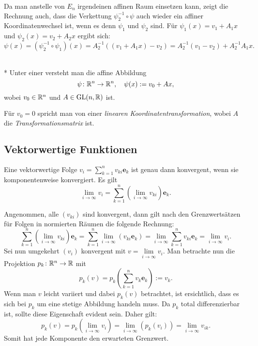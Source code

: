 Da man anstelle von $E_n$ irgendeinen affinen Raum einsetzen kann,
zeigt die Rechnung auch, dass die Verkettung $\psi_2^{-1}\circ\psi$
auch wieder ein affiner Koordinatenwechsel ist, wenn es denn $\psi_1$
und $\psi_2$ sind. Für $\psi_1(x)=v_1+A_1 x$ und
$\psi_2(x) = v_2+A_2 x$
ergibt sich:%
\begin{equation}
\psi(x) = (\psi_2^{-1}\circ\psi_1)(x)
= A_2^{-1}((v_1+A_1x)-v_2)
= A_2^{-1}(v_1-v_2) + A_2^{-1} A_1 x.
\end{equation}

\begin{definition}\mbox{}\\*
Unter einer  versteht man
die affine Abbildung
\begin{equation}
\psi\colon\mathbb R^n\to\mathbb R^n,\quad \psi(x):=v_0+Ax,
\end{equation}
wobei $v_0\in\mathbb R^n$ und $A\in\operatorname{GL}(n,\mathbb R)$ ist.
\end{definition}
Für $v_0=0$ spricht man von einer \emph{linearen
Koordinatentransformation}, wobei $A$ die \emph{Transformationsmatrix}
ist.

\subsection{Vektorwertige Funktionen}
\begin{theorem}\label{lim-vektorwertige-Folge}
Eine vektorwertige Folge $v_i = \sum_{k=1}^n v_{ki}\mathbf e_k$
ist genau dann konvergent, wenn sie komponentenweise konvergiert.
Es gilt
\begin{equation}
\lim_{i\to\infty} v_i
= \sum_{k=1}^n (\lim_{i\to\infty} v_{ki})\mathbf e_k.
\end{equation}
\end{theorem}
 Angenommen, alle $(v_{ki})$ sind konvergent, dann gilt
nach den Grenzwertsätzen für Folgen in normierten Räumen die folgende
Rechnung:
\begin{equation}
\sum_{k=1}^n (\lim_{i\to\infty} v_{ki})\mathbf e_k
= \sum_{k=1}^n \lim_{i\to\infty} (v_{ki}\mathbf e_k)
= \lim_{i\to\infty}\sum_{k=1}^n v_{ki}\mathbf e_k = \lim_{i\to\infty} v_i.
\end{equation}
Sei nun umgekehrt $(v_i)$ konvergent mit $v = \lim\limits_{i\to\infty} v_i$.
Man betrachte nun die Projektion $p_k\colon\mathbb R^n\to\mathbb R$ mit
\begin{equation}
p_k(v) = p_k(\sum_{k=1}^n v_k\mathbf e_k) := v_k.
\end{equation}
Wenn man $v$ leicht variiert und dabei $p_k(v)$ betrachtet, ist
ersichtlich, dass es sich bei $p_k$ um eine stetige Abbildung handeln
muss. Da $p_k$ total differenzierbar ist, sollte diese Eigenschaft
evident sein. Daher gilt:
\begin{equation}
p_k(v) = p_k(\lim_{i\to\infty} v_i) = \lim_{i\to\infty}(p_k(v_i))
= \lim_{i\to\infty} v_{ik}.
\end{equation}
Somit hat jede Komponente den erwarteten Grenzwert.\;\qedsymbol

